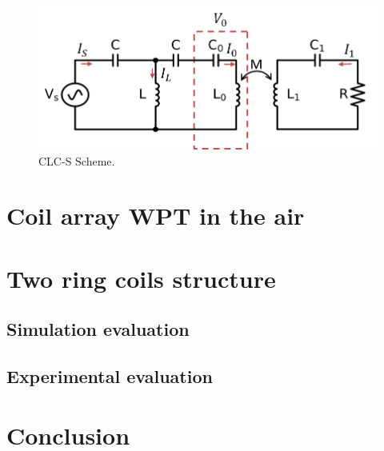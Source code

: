 \begin{figure}[htbp]
    \centering
    \includegraphics[width=0.7\linewidth]{images/3_clc_s_scheme.png}
    \caption{CLC-S Scheme.}
    \label{fig:3_clc_s_scheme}
\end{figure}


\section{Coil array WPT in the air}
\section{Two ring coils structure}
\subsection{Simulation evaluation}
\subsection{Experimental evaluation}

\section{Conclusion}